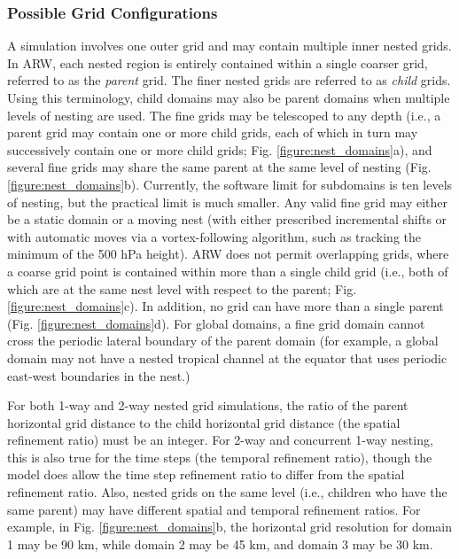 \subsubsection{Possible Grid Configurations}

A simulation involves one outer grid and may contain multiple
inner nested grids.  In ARW, each nested region is entirely
contained within 
a single coarser grid, referred to as the {\em parent}
grid.  The finer nested grids are referred to as {\em child} grids.
Using this terminology, child domains may also be parent domains when multiple levels
of nesting are used.  The fine grids may be telescoped to any depth (i.e., 
a
parent grid may contain one or more child grids, each of which in turn
may successively contain one or more child grids; Fig.
\ref{figure:nest_domains}a), and several fine grids may share the
same parent at the same level of nesting (Fig.
\ref{figure:nest_domains}b). Currently, the software limit for subdomains is 
ten levels of nesting, but the practical limit is much smaller.
Any valid fine grid may either be a static domain or a moving nest
(with either prescribed incremental shifts or with automatic moves
via a vortex-following algorithm, such as tracking the minimum of the 500 hPa height).  
ARW does not permit overlapping
grids, where a coarse grid point is contained within more than a
single child grid (i.e., both of which are at the same nest level with respect
to the parent; Fig. \ref{figure:nest_domains}c).  In addition, no grid can have
more than a single parent (Fig. \ref{figure:nest_domains}d).  For global domains, a
fine grid domain cannot cross the periodic lateral boundary of the parent domain
(for example, a global domain may not have a nested tropical channel at the 
equator that uses periodic east-west boundaries in the nest.)

For both 1-way and 2-way nested grid simulations, the ratio of the
parent horizontal grid distance to the child horizontal grid distance
(the spatial refinement ratio) must be an integer.  For 2-way and concurrent 1-way
nesting, this is also true for
the time steps (the temporal refinement ratio), though the model does allow
the time step refinement ratio to differ from the spatial refinement
ratio.  Also, nested grids on the same level (i.e., children who have the
same parent) may have different spatial and temporal refinement ratios.  For example,
in Fig. \ref{figure:nest_domains}b, the horizontal grid resolution for 
domain 1 may be 90 km, while
domain 2 may be 45 km, and domain 3 may be 30 km.

